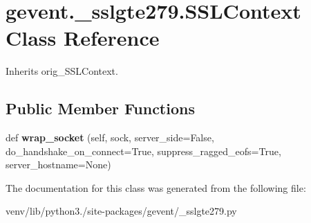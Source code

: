 \hypertarget{classgevent_1_1__sslgte279_1_1_s_s_l_context}{}\section{gevent.\+\_\+sslgte279.\+S\+S\+L\+Context Class Reference}
\label{classgevent_1_1__sslgte279_1_1_s_s_l_context}


Inherits orig\+\_\+\+S\+S\+L\+Context.

\subsection*{Public Member Functions}
\begin{DoxyCompactItemize}
\item 
\mbox{\label{classgevent_1_1__sslgte279_1_1_s_s_l_context_aad9f9a1594a6842b2bb941be34aa07c7}} 
def {\bfseries wrap\+\_\+socket} (self, sock, server\+\_\+side=False, do\+\_\+handshake\+\_\+on\+\_\+connect=True, suppress\+\_\+ragged\+\_\+eofs=True, server\+\_\+hostname=None)
\end{DoxyCompactItemize}


The documentation for this class was generated from the following file\+:\begin{DoxyCompactItemize}
\item 
venv/lib/python3./site-\/packages/gevent/\+\_\+sslgte279.\+py\end{DoxyCompactItemize}
